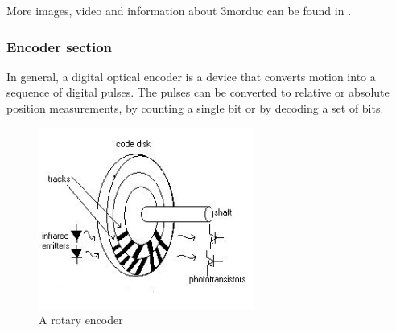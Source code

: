 More images, video and information about 3morduc can
be found in \cite{morduc:features}.


\subsubsection{Encoder section}
\label{sec:3morduc:encoder}

In general, a digital optical encoder is a device that converts motion
into a sequence of digital pulses. The pulses can be converted to relative
or absolute position measurements, by counting a single bit or by decoding
a set of bits.

\begin{figure}
  \begin{center}
    \includegraphics[width=200pt]{img/encoder.jpg}
    \caption{A rotary encoder}
    \label{fig:encoder}
  \end{center}
\end{figure}

